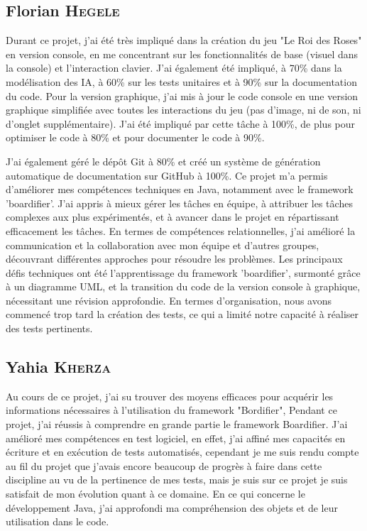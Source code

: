 \subsection*{Florian \textsc{Hegele}}

Durant ce projet, j'ai été très impliqué dans la création du jeu "Le Roi des Roses" en version console, en me concentrant sur les fonctionnalités de base (visuel dans la console) et l'interaction clavier. J'ai également été impliqué, à 70\% dans la modélisation des IA, à 60\% sur les tests unitaires et à 90\% sur la documentation du code.
Pour la version graphique, j'ai mis à jour le code console en une version graphique simplifiée avec toutes les interactions du jeu (pas d’image, ni de son, ni d’onglet supplémentaire). J'ai  été impliqué par cette tâche à 100\%, de plus pour optimiser le code à 80\% et pour documenter le code à 90\%. 

J'ai également géré le dépôt Git à 80\% et créé un système de génération automatique de documentation sur GitHub à 100\%.
Ce projet m'a permis d'améliorer mes compétences techniques en Java, notamment avec le framework 'boardifier'. J'ai appris à mieux gérer les tâches en équipe, à attribuer les tâches complexes aux plus expérimentés, et à avancer dans le projet en répartissant efficacement les tâches.
En termes de compétences relationnelles, j'ai amélioré la communication et la collaboration avec mon équipe et d'autres groupes, découvrant différentes approches pour résoudre les problèmes.
Les principaux défis techniques ont été l'apprentissage du framework 'boardifier', surmonté grâce à un diagramme UML, et la transition du code de la version console à graphique, nécessitant une révision approfondie. En termes d'organisation, nous avons commencé trop tard la création des tests, ce qui a limité notre capacité à réaliser des tests pertinents.

\subsection*{Yahia \textsc{Kherza}}

Au cours de ce projet, j’ai su trouver des moyens efficaces pour acquérir les informations nécessaires à l’utilisation du framework "Bordifier", 
Pendant ce projet, j'ai réussis à comprendre en grande partie le framework Boardifier.
J’ai amélioré mes compétences en test logiciel, en effet, j'ai affiné mes capacités en écriture et en exécution de tests automatisés, cependant je me suis rendu compte au fil du projet que j'avais encore beaucoup de progrès à faire dans cette discipline au vu de la pertinence de mes tests, mais je suis sur ce projet je suis satisfait de mon évolution quant à ce domaine.
En ce qui concerne le développement Java, j’ai approfondi ma compréhension des objets et de leur utilisation dans le code.

